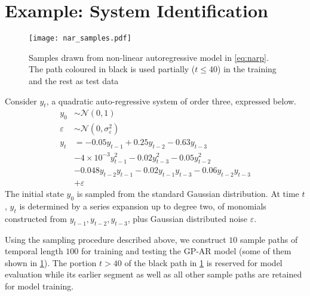 \section*{Example: System Identification}

\begin{figure}[ht]
    \centering
    \noindent\texttt{[image: nar\_samples.pdf]}
    \caption{Samples drawn from non-linear autoregressive model in \cref{eq:narp}. 
    The path coloured in black is used partially ($t \leq 40$) in the training and the rest 
    as test data}
    \label{fig:narpSamples}
\end{figure}

Consider $y_t$, a quadratic auto-regressive system of order three, expressed below.
%
\begin{align}\label{eq:narp}
    y_0 &\sim \mathcal{N}(0, 1)\\
    \varepsilon &\sim \mathcal{N}(0, \sigma^{2}_{\varepsilon})\\
    y_t &= -0.05 y_{t-1} + 0.25 y_{t-2} - 0.63 y_{t-3} \\
        & - 4\times10^{-3} y^2_{t-1} - 0.02 y^{2}_{t-3} - 0.05 y^{2}_{t-2} \\ 
        & - 0.048 y_{t-2} y_{t-1} - 0.02 y_{t-1} y_{t-3} - 0.06 y_{t-2} y_{t-3} \\
        & + \varepsilon
\end{align}
%
The initial state $y_0$ is sampled from the standard Gaussian distribution. At time $t$, $y_t$ is determined 
by a series expansion up to degree two, of monomials constructed from $y_{t-1}, y_{t-2}, y_{t-3}$, plus Gaussian 
distributed noise $\varepsilon$.

Using the sampling procedure described above, we construct $10$ sample paths of temporal length $100$ for 
training and testing the GP-AR model (some of them shown in \cref{fig:narpSamples}). The portion $t > 40$ of the 
black path in \cref{fig:narpSamples} is reserved for model evaluation while its earlier segment as well 
as all other sample paths are retained for model training.  

